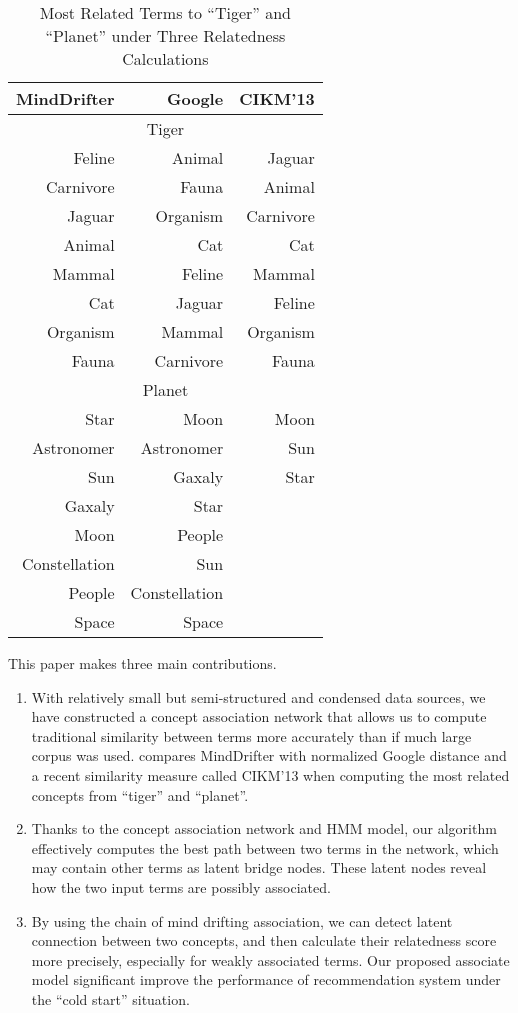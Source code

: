 \begin{table}[th]
\centering
\caption{Most Related Terms to ``Tiger'' and ``Planet''
under Three Relatedness Calculations}
\label{tab:comparison}
\small
\begin{tabular}{|r|r|r|}
\hline
{\bf MindDrifter} & Google & CIKM'13\\
\hline
\multicolumn{3}{|c|}{Tiger}\\
\hline
Feline & Animal & Jaguar\\
Carnivore & Fauna & Animal\\
Jaguar & Organism & Carnivore\\
Animal & Cat & Cat\\
Mammal & Feline & Mammal\\
Cat & Jaguar & Feline\\
Organism & Mammal & Organism\\
Fauna & Carnivore & Fauna\\
\hline
\multicolumn{3}{|c|}{Planet}\\
\hline
Star & Moon & Moon\\
Astronomer & Astronomer & Sun\\
Sun & Gaxaly & Star\\
Gaxaly & Star & \\
Moon & People & \\
Constellation & Sun & \\
People & Constellation & \\
Space & Space & \\
\hline
\end{tabular}
\end{table}

This paper makes three main contributions.
\begin{enumerate}
\item With relatively small but semi-structured and condensed data sources,
we have constructed a concept association network that allows us to
compute traditional similarity between terms more accurately than if
much large corpus was used.
 compares MindDrifter with normalized
Google distance and a recent similarity measure called CIKM'13 \cite{LiWZWW13}
when computing the most related concepts from ``tiger'' and ``planet''.
\item Thanks to the concept association network
and HMM model, our algorithm effectively computes the best path between
two terms in the network, which may contain other terms as latent
bridge nodes. These latent nodes reveal how the two input terms
are possibly associated.
\item By using the chain of mind drifting association,
we can detect latent connection between two concepts,
and then calculate their relatedness score more precisely,
especially for weakly associated terms. Our proposed associate model
significant improve the performance of recommendation system
under the ``cold start'' situation.
\end{enumerate}


